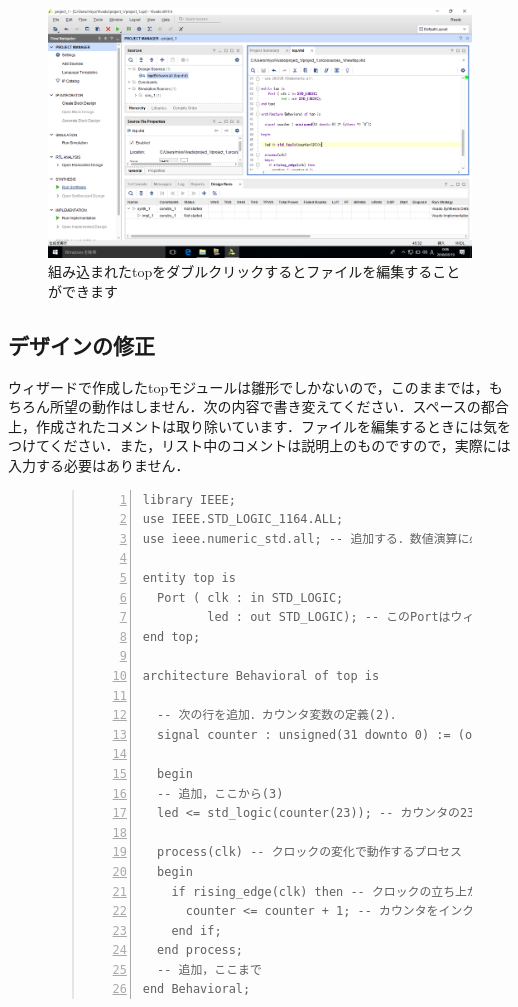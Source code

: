 \documentclass[a4paper,dvipdfmx]{jsarticle}
\begin{document}
 \begin{figure}[H]
  \begin{center}
   \includegraphics[width=.8\textwidth]{chapter03_figures/VirtualBox_Windows10_19_03_2018_00_06_55.png}
  \end{center}
  \caption{組み込まれたtopをダブルクリックするとファイルを編集することができます}
 \end{figure}

\subsection{デザインの修正}
ウィザードで作成したtopモジュールは雛形でしかないので，このままでは，もちろん所望の動作はしません．次の内容で書き変えてください．スペースの都合上，作成されたコメントは取り除いています．ファイルを編集するときには気をつけてください．また，リスト中のコメントは説明上のものですので，実際には入力する必要はありません．

\begin{figure}[H]
\begin{quote}
\begin{Verbatim}[frame=single, numbers=left, baselinestretch=0.8]
library IEEE;
use IEEE.STD_LOGIC_1164.ALL;
use ieee.numeric_std.all; -- 追加する．数値演算に必要(1)．

entity top is
  Port ( clk : in STD_LOGIC;
         led : out STD_LOGIC); -- このPortはウィザードで作成された
end top;

architecture Behavioral of top is

  -- 次の行を追加．カウンタ変数の定義(2)．
  signal counter : unsigned(31 downto 0) := (others => '0'); 

  begin
  -- 追加，ここから(3)
  led <= std_logic(counter(23)); -- カウンタの23bit目をledに接続

  process(clk) -- クロックの変化で動作するプロセス
  begin
    if rising_edge(clk) then -- クロックの立ち上がりであれば
      counter <= counter + 1; -- カウンタをインクリメント
    end if;
  end process;
  -- 追加，ここまで
end Behavioral;
  \end{Verbatim}
 \end{quote}
\end{figure}
\end{document}
